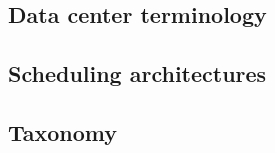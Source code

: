 

\subsection{Data center terminology}


\subsection{Scheduling architectures} \label{rm_architectures}


\subsection{Taxonomy} \label{rm_taxonomy}
